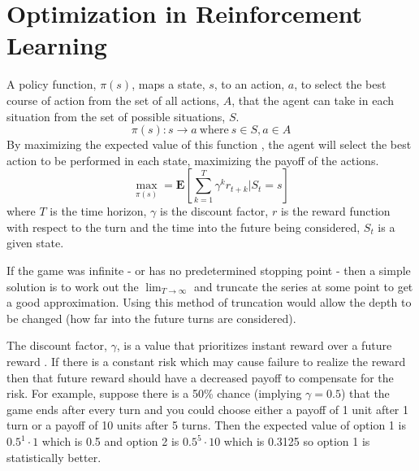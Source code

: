 \documentclass[10pt,a4paper]{report}
\begin{document}
		\section{Optimization in Reinforcement Learning}
			A policy function, $\pi(s)$, maps a state, $s$, to an action, $a$, to select the best course of action from the set of all actions, $A$, that the agent
			can take in each situation from the set of possible situations, $S$.
			\[\pi(s) : s \to a \ \text{where} \ s\in S, a \in A\]
			By maximizing the expected value of this function \autocite[p. 4]{SurveyOfOptimizationMethods}, the agent will select the
			best action to be performed in each state, maximizing the payoff of the actions.
			\begin{equation}
				\max_{\pi(s)} = \mathbf{E} \left[\sum_{k=1}^{T} \gamma^k r_{t+k} | S_t = s \right]
				\label{eq:reinforcement-learning}
			\end{equation}
			where $T$ is the time horizon, $\gamma$ is the discount factor, $r$ is the reward function with respect to the turn and
			the time into the future being considered, $S_t$ is a given state. \par
			If the game was infinite - or has no predetermined stopping point -
			then a simple solution is to work out the $\lim_{T \to \infty}$ and truncate the series at some point to get a good approximation.
			Using this method of truncation would allow the depth to be changed (how far into the future turns are considered). \par
			The discount factor, $\gamma$, is a value that prioritizes instant reward over a future reward \autocite{sozou1998hyperbolic}.
			If there is a constant risk which may cause failure to realize the reward then that future reward should
			have a decreased payoff to compensate for the risk. For example, suppose there is a 50\% chance (implying $\gamma = 0.5$) that the game ends after every
			turn and you could choose either a payoff of 1 unit after 1 turn or a payoff of 10 units after 5 turns. Then the expected value of option 1 is
			$0.5^1 \cdot  1$ which is 0.5 and option 2 is $0.5^5 \cdot  10$ which is 0.3125 so option 1 is statistically better.
\end{document}

